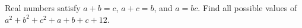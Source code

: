 Real numbers satisfy $a+b=c$, $a+c=b$, and $a=bc$. Find all possible values of $a^2+b^2+c^2+a+b+c+12$.
